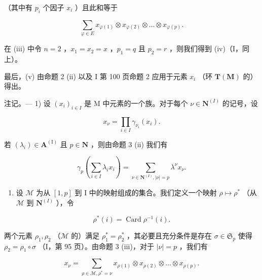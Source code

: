 （其中有 \(p_i\) 个因子 \(x_i\) ）且此和等于

\[
\sum_ {\varphi \in E} x _ {\varphi (1)} \otimes x _ {\varphi (2)} \otimes \dots \otimes x _ {\varphi (p)}.
\]

在 (iii) 中令 \(n = 2\) ，\(x_{1} = x_{2} = x\) ，\(p_{1} = q\) 且 \(p_{2} = r\) ，则我们得到 (iv)（I，同上）。

最后，(v) 由命题 2 (ii) 以及 I 第 100 页命题 2 应用于元素 \(x_{i}\) （环 \(\mathbf{T}(\mathbf{M})\) 的）得出。

注记。--- 1) 设 \((x_{i})_{i\in I}\) 是 M 中元素的一个族。对于每个 \(\nu \in \mathbf{N}^{(I)}\) 的记号，设

\[
x _ {\nu} = \prod_ {i \in I} \gamma_ {\nu_ {i}} (x _ {i}).
\]

若 \((\lambda_{i})\in \mathbf{A}^{(\mathrm{I})}\) 且 \(p\in \mathbf{N}\) ，则由命题 3 (ii) 我们有

\[
\gamma_ {p} \left(\sum_ {i \in I} \lambda_ {i} x _ {i}\right) = \sum_ {\nu \in \mathbf {N} ^ {(I)}, | \nu | = p} \lambda^ {\nu} x _ {\nu}.\tag{6}
\]

\begin{enumerate}
\def\labelenumi{\arabic{enumi})}
\setcounter{enumi}{1}
\tightlist
\item
  设 \(\mathcal{M}\) 为从 \([1, p]\) 到 I 中的映射组成的集合。我们定义一个映射 \(\rho \mapsto \rho^{*}\) （从 \(\mathcal{M}\) 到 \(\mathbf{N}^{(I)}\) ），令
\end{enumerate}

\[
\rho^ {*} (i) = \operatorname{Card} \rho^ {- 1} (i).
\]

两个元素 \(\rho_1, \rho_2\) （\(\mathcal{M}\) 的）满足 \(\rho_1^* = \rho_2^*\) ，其必要且充分条件是存在 \(\sigma \in \mathfrak{S}_p\) 使得 \(\rho_2 = \rho_1 \circ \sigma\) （I，第 95 页）。由命题 3 (iii)，对于 \(|\nu| = p\) ，我们有

\[
x _ {\nu} = \sum_ {\rho \in \mathcal {M}, \rho^ {*} = \nu} x _ {\rho (1)} \otimes x _ {\rho (2)} \otimes \dots \otimes x _ {\rho (p)}.\tag{7}
\]

